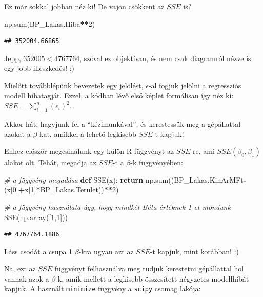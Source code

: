 \documentclass[
]{book}
\newenvironment{Shaded}{\begin{snugshade}}{\end{snugshade}}
\newcommand{\BuiltInTok}[1]{#1}
\newcommand{\CommentTok}[1]{\textcolor[rgb]{0.56,0.35,0.01}{\textit{#1}}}
\newcommand{\ControlFlowTok}[1]{\textcolor[rgb]{0.13,0.29,0.53}{\textbf{#1}}}
\newcommand{\DecValTok}[1]{\textcolor[rgb]{0.00,0.00,0.81}{#1}}
\newcommand{\KeywordTok}[1]{\textcolor[rgb]{0.13,0.29,0.53}{\textbf{#1}}}
\newcommand{\NormalTok}[1]{#1}
\newcommand{\OperatorTok}[1]{\textcolor[rgb]{0.81,0.36,0.00}{\textbf{#1}}}
\begin{document}
Ez már sokkal jobban néz ki! De vajon csökkent az \(SSE\) is?

\begin{Shaded}
\begin{Highlighting}[]
\NormalTok{np.}\BuiltInTok{sum}\NormalTok{(BP\_Lakas.Hiba}\OperatorTok{**}\DecValTok{2}\NormalTok{)}
\end{Highlighting}
\end{Shaded}

\begin{verbatim}
## 352004.66865
\end{verbatim}

Jepp, \(352005<4767764\), szóval ez objektívan, és nem csak diagramról nézve is egy jobb illeszkedés! :)

Mielőtt továbblépünk bevezetek egy jelölést, \(\epsilon\)-al fogjuk jelölni a regressziós modell hibatagját. Ezzel, a kódban lévő első képlet formálisan így néz ki: \(SSE=\sum_{i=1}^n(\epsilon_i)^2\).

Akkor hát, hagyjunk fel a ``kézimunkával'', és kerestessük meg a gépállattal azokat a \(\beta\)-kat, amikkel a lehető legkisebb \(SSE\)-t kapjuk!

Ehhez először megcsinálunk egy külön R függvényt az \(SSE\)-re, ami \(SSE(\beta_0,\beta_1)\) alakot ölt. Tehát, megadja az \(SSE\)-t a \(\beta\)-k függvényében:

\begin{Shaded}
\begin{Highlighting}[]
\CommentTok{\# a függvény megadása}
\KeywordTok{def}\NormalTok{ SSE(x):}
  \ControlFlowTok{return}\NormalTok{ np.}\BuiltInTok{sum}\NormalTok{((BP\_Lakas.KinArMFt}\OperatorTok{{-}}\NormalTok{(x[}\DecValTok{0}\NormalTok{]}\OperatorTok{+}\NormalTok{x[}\DecValTok{1}\NormalTok{]}\OperatorTok{*}\NormalTok{BP\_Lakas.Terulet))}\OperatorTok{**}\DecValTok{2}\NormalTok{)}

\CommentTok{\# a függvény használata úgy, hogy mindkét Béta értéknek 1{-}et mondunk}
\NormalTok{SSE(np.array([}\DecValTok{1}\NormalTok{,}\DecValTok{1}\NormalTok{]))}
\end{Highlighting}
\end{Shaded}

\begin{verbatim}
## 4767764.1886
\end{verbatim}

Láss csodát a csupa 1 \(\beta\)-kra ugyan azt az \(SSE\)-t kapjuk, mint korábban! :)

Na, ezt az \(SSE\) függvényt felhasználva meg tudjuk kerestetni gépállattal hol vannak azok a \(\beta\)-k, amik mellett a legkisebb összesített négyzetes modellhibát kapjuk. A használt \texttt{minimize} függvény a \texttt{scipy} csomag lakója:
\end{document}
